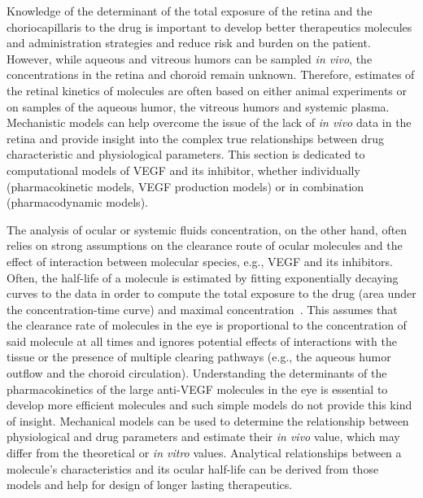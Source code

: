 \documentclass[11pt,a4paper, twocolumn]{article}
\begin{document}
Knowledge of the determinant of the total exposure of the retina and the choriocapillaris to the drug is important to develop better therapeutics molecules and administration strategies and reduce risk and burden on the patient.
However, while aqueous and vitreous humors can be sampled \textit{in vivo}, the concentrations in the retina and choroid remain unknown. 
Therefore, estimates of the retinal kinetics of molecules are often based on either animal experiments or on samples of the aqueous humor, the vitreous humors and systemic plasma.
Mechanistic models can help overcome the issue of the lack of \textit{in vivo} data in the retina and provide insight into the complex true relationships between drug characteristic and physiological parameters.
This section is dedicated to computational models of VEGF and its inhibitor, whether individually (pharmacokinetic models, VEGF production models) or in combination (pharmacodynamic models).


The analysis of ocular or systemic fluids concentration, on the other hand, often relies on strong assumptions on the clearance route of ocular molecules and the effect of interaction between molecular species, e.g., VEGF and its inhibitors.
Often, the half-life of a molecule is estimated by fitting exponentially decaying curves to the data in order to compute the total exposure to the drug (area under the concentration-time curve) and maximal concentration~\cite{Bakri_2007, Kaiser_2019, Park_2015, Park_2016, Xu_2013}.
This assumes that the clearance rate of molecules in the eye is proportional to the concentration of said molecule at all times and ignores potential effects of interactions with the tissue or the presence of multiple clearing pathways (e.g., the aqueous humor outflow and the choroid circulation).
Understanding the determinants of the pharmacokinetics of the large anti-VEGF molecules in the eye is essential to develop more efficient molecules and such simple models do not provide this kind of insight.
Mechanical models can be used to determine the relationship between physiological and drug parameters and estimate their \textit{in vivo} value, which may differ from the theoretical or \textit{in vitro} values.
Analytical relationships between a molecule's characteristics and its ocular half-life can be derived from those models and help for design of longer lasting therapeutics.
\end{document}
